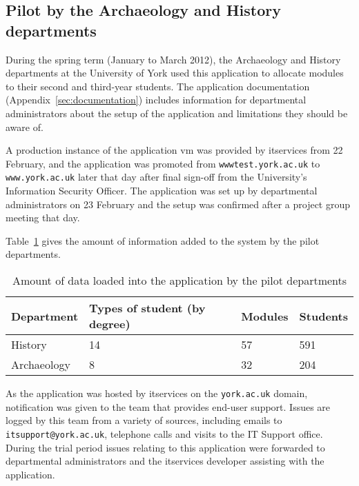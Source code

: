 
\subsection{Pilot by the Archaeology and History departments}
\label{sec:developmentpilot}

During the spring term (January to March 2012), the Archaeology and History
departments at the University of York used this application to allocate
modules to their second and third-year students. The application documentation
(Appendix~\ref{sec:documentation}) includes information for departmental
administrators about the setup of the application and limitations they should
be aware of.

A production instance of the application \gls{vm} was provided by
\gls{itservices} from 22 February, and the application was promoted from
\texttt{wwwtest.york.ac.uk} to \texttt{www.york.ac.uk} later that day after
final sign-off from the University's Information Security Officer. The
application was set up by departmental administrators on 23 February and the
setup was confirmed after a project group meeting that day.

Table~\ref{development_pilot_department_numbers} gives the amount of
information added to the system by the pilot departments.

\begin{table}
  \begin{center}
    \begin{tabular}{ | l | l | l | l | }
      \hline
      \textbf{Department}  & \textbf{Types of student (by degree)} & \textbf{Modules} & \textbf{Students} \\
      \hline
      History     & 14                           & 57      & 591      \\
      Archaeology & 8                            & 32      & 204      \\
      \hline
    \end{tabular}
  \end{center}
  \caption{Amount of data loaded into the application by the pilot departments}
  \label{development_pilot_department_numbers}
\end{table}

As the application was hosted by \gls{itservices} on the \texttt{york.ac.uk}
domain, notification was given to the team that provides end-user support.
Issues are logged by this team from a variety of sources, including emails to
\texttt{itsupport@york.ac.uk}, telephone calls and visits to the IT Support
office. During the trial period issues relating to this application were
forwarded to departmental administrators and the \gls{itservices} developer
assisting with the application.

